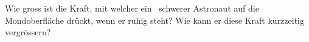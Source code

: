 Wie gross ist die Kraft, mit welcher ein \mAsO\ schwerer Astronaut auf die Mondoberfläche drückt, wenn er ruhig steht? Wie kann er diese Kraft kurzzeitig vergrössern?
